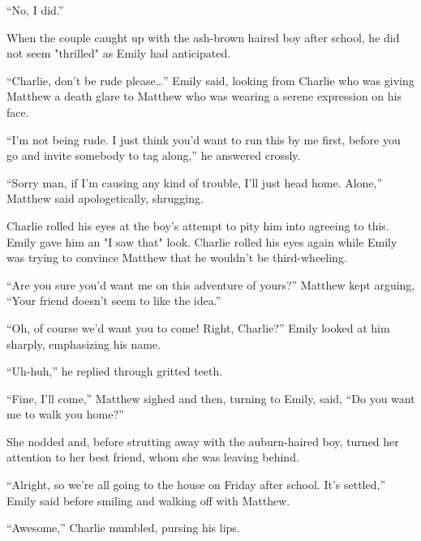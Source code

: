 “No, I did.”

When the couple caught up with the ash-brown haired boy after school, he did not seem "thrilled" as Emily had anticipated.

“Charlie, don't be rude please…” Emily said, looking from Charlie who was giving Matthew a death glare to Matthew who was wearing a serene expression on his face.

“I'm not being rude. I just think you'd want to run this by me first, before you go and invite somebody to tag along,” he answered crossly.

“Sorry man, if I'm causing any kind of trouble, I'll just head home. Alone,” Matthew said apologetically, shrugging.

Charlie rolled his eyes at the boy's attempt to pity him into agreeing to this. Emily gave him an "I saw that" look. Charlie rolled his eyes again while Emily was trying to convince Matthew that he wouldn't be third-wheeling.

“Are you sure you'd want me on this adventure of yours?” Matthew kept arguing, “Your friend doesn't seem to like the idea.”

“Oh, of course we'd want you to come! Right, Charlie?” Emily looked at him sharply, emphasizing his name.

“Uh-huh,” he replied through gritted teeth.

“Fine, I'll come,” Matthew sighed and then, turning to Emily, said, “Do you want me to walk you home?”

She nodded and, before strutting away with the auburn-haired boy, turned her attention to her best friend, whom she was leaving behind.

“Alright, so we're all going to the house on Friday after school. It's settled,” Emily said before smiling and walking off with Matthew.

“Awesome,” Charlie mumbled, pursing his lips.
